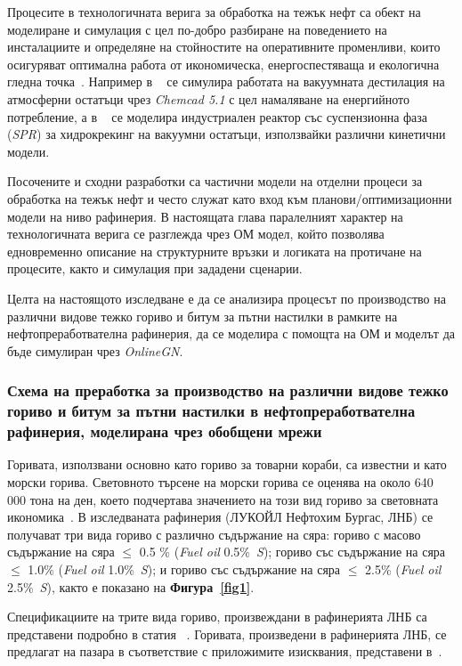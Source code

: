 Процесите в технологичната верига за обработка на тежък нефт са обект на моделиране и симулация с цел по-добро разбиране на поведението на инсталациите и определяне на стойностите на оперативните променливи, които осигуряват оптимална работа от икономическа, енергоспестяваща и екологична гледна точка~\cite{103,104}. Например в ~\cite{103} се симулира работата на вакуумната дестилация на атмосферни остатъци чрез \textit{Chemcad 5.1} с цел намаляване на енергийното потребление, а в ~\cite{104} се моделира индустриален реактор със суспензионна фаза (\textit{SPR}) за хидрокрекинг на вакуумни остатъци, използвайки различни кинетични модели.

Посочените и сходни разработки са частични модели на отделни процеси за обработка на тежък нефт и често служат като вход към планови/оптимизационни модели на ниво рафинерия. В настоящата глава паралелният характер на технологичната верига се разглежда чрез ОМ модел, който позволява едновременно описание на структурните връзки и логиката на протичане на процесите, както и симулация при зададени сценарии.

Целта на настоящото изследване е да се анализира процесът по производство на различни видове тежко гориво и битум за пътни настилки в рамките на нефтопреработвателна рафинерия, да се моделира с помощта на ОМ и моделът да бъде симулиран чрез \textit{OnlineGN}.
\subsubsection{Схема на преработка за производство на различни видове тежко гориво и битум за пътни настилки в нефтопреработвателна рафинерия, моделирана чрез обобщени мрежи}

\hspace*{2.5em}Горивата, използвани основно като гориво за товарни кораби, са известни и като морски горива. Световното търсене на морски горива се оценява на около 640 000 тона на ден, което подчертава значението на този вид гориво за световната икономика~\cite{123}. В изследваната рафинерия (ЛУКОЙЛ Нефтохим Бургас, ЛНБ) се получават три вида гориво с различно съдържание на сяра: гориво с масово съдържание на сяра $\leq$ 0.5 \% (\textit{Fuel oil} 0.5\%~\textit{S}); гориво със съдържание на сяра $\leq$ 1.0\% (\textit{Fuel oil} 1.0\%~\textit{S}); и гориво със съдържание на сяра $\leq$ 2.5\% (\textit{Fuel oil} 2.5\%~\textit{S}), както е показано на \textbf{Фигура~\ref{fig1}}.

Спецификациите на трите вида гориво, произвеждани в рафинерията ЛНБ са представени подробно в статия  ~\cite{Stratiev2023_2}. Горивата, произведени в рафинерията ЛНБ, се предлагат на пазара в съответствие с приложимите изисквания, представени в~\cite{Stratiev2023_2}.

